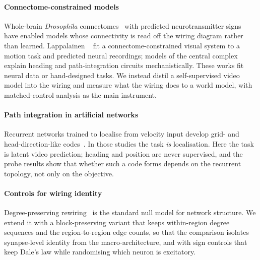 \paragraph{Connectome-constrained models}
Whole-brain \emph{Drosophila} connectomes~\cite{dorkenwald2024neuronal,schlegel2024whole} with predicted neurotransmitter
signs~\cite{eckstein2024neurotransmitter} have enabled models whose connectivity is read off the wiring diagram rather than
learned. Lappalainen \etal~\cite{lappalainen2024connectome} fit a connectome-constrained visual system to a motion task
and predicted neural recordings; models of the central complex~\cite{hulse2021connectome,stone2017anatomically}
explain heading and path-integration circuits mechanistically. These works fit neural data or hand-designed tasks. We
instead distil a self-supervised video model into the wiring and measure what the wiring does to a world model,
with matched-control analysis as the main instrument.

\paragraph{Path integration in artificial networks}
Recurrent networks trained to localise from velocity input develop grid- and head-direction-like
codes~\cite{cueva2018emergence,banino2018vector,sorscher2019unified}. In those studies the task \emph{is} localisation.
Here the task is latent video prediction; heading and position are never supervised, and the probe results show that
whether such a code forms depends on the recurrent topology, not only on the objective.

\paragraph{Controls for wiring identity}
Degree-preserving rewiring~\cite{maslov2002specificity} is the standard null model for network structure. We extend it
with a block-preserving variant that keeps within-region degree sequences and the region-to-region edge counts, so that
the comparison isolates synapse-level identity from the macro-architecture, and with sign controls that keep Dale's law
while randomising which neuron is excitatory.
